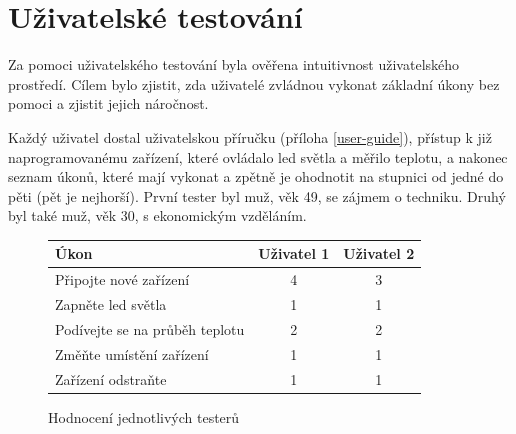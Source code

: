 

\section{Uživatelské testování}
Za pomoci uživatelského testování byla ověřena intuitivnost uživatelského prostředí. Cílem bylo zjistit, zda uživatelé zvládnou vykonat základní úkony bez pomoci a zjistit jejich náročnost.

Každý uživatel dostal uživatelskou příručku (příloha \ref{user-guide}), přístup k již naprogramovanému zařízení, které ovládalo led světla a měřilo teplotu, a nakonec seznam úkonů, které mají vykonat a zpětně je ohodnotit na stupnici od jedné do pěti (pět je nejhorší). První tester byl muž, věk 49, se zájmem o techniku. Druhý byl také muž, věk 30, s ekonomickým vzděláním.


\begin{figure}
    \centering
    \begin{tabular}{ | l | c | c | }
        \hline
        Úkon                           & Uživatel 1 & Uživatel 2 \\
        \hline
        Připojte nové zařízení         & 4          & 3          \\
        \hline
        Zapněte led světla             & 1          & 1          \\
        \hline
        Podívejte se na průběh teplotu & 2          & 2          \\
        \hline
        Změňte umístění zařízení       & 1          & 1          \\
        \hline
        Zařízení odstraňte             & 1          & 1          \\
        \hline
    \end{tabular}
    \caption{Hodnocení jednotlivých testerů}
\end{figure}

